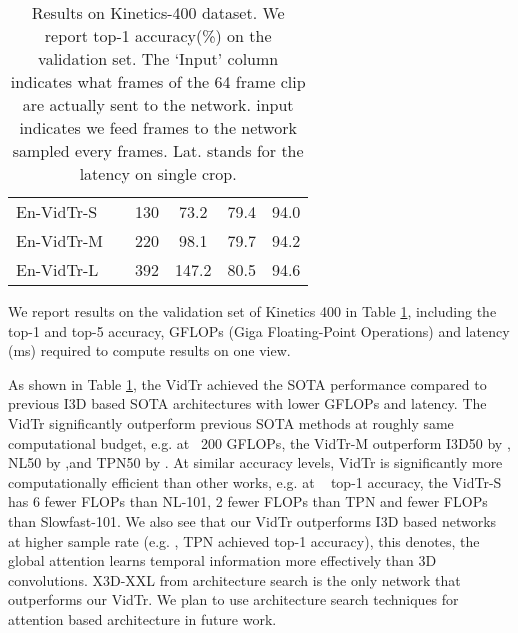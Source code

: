 \documentclass[10pt,twocolumn,letterpaper]{article}
\begin{document}
\begin{table}[h!]
\begin{center}
{\begin{tabularx}{1.03\columnwidth}{l|c|c|c|c|c}
			\midrule
			En-VidTr-S              &  & 130 & 73.2 & 79.4 &  94.0\\
			En-VidTr-M              &  & 220 & 98.1 & 79.7 &  94.2\\
			En-VidTr-L              &  & 392 & 147.2 &  80.5 &  94.6\\
			\bottomrule
		\end{tabularx}}
	\end{center}
	\caption{Results on Kinetics-400 dataset. We report top-1 accuracy(\%) on the validation set. The `Input' column indicates what frames of the 64 frame clip are actually sent to the network.  input indicates we feed  frames to the network sampled every  frames. Lat. stands for the latency on single crop.}
	\label{tab:k400_res}
\end{table}

We report results on the validation set of Kinetics 400 in Table \ref{tab:k400_res}, including the top-1 and top-5 accuracy, GFLOPs (Giga Floating-Point Operations) and latency (ms) required to compute results on one view. 

As shown in Table \ref{tab:k400_res}, the VidTr achieved the SOTA performance compared to previous I3D based SOTA architectures with lower GFLOPs and latency.
The VidTr significantly outperform previous SOTA methods at roughly same computational budget, e.g. at ~200 GFLOPs, the VidTr-M outperform I3D50 by , NL50 by ,and TPN50 by .
At similar accuracy levels, VidTr is significantly more computationally efficient than other works, e.g. at  ~ top-1 accuracy, the VidTr-S has 6 fewer FLOPs than NL-101, 2 fewer FLOPs than TPN and  fewer FLOPs than Slowfast-101.
We also see that our VidTr outperforms I3D based networks at higher sample rate (e.g. , TPN achieved  top-1 accuracy), this denotes, the global attention learns temporal information more effectively than 3D convolutions.
X3D-XXL from architecture search is the only network that outperforms our VidTr. We plan to use architecture search techniques for attention based architecture in future work. 
\end{document}
